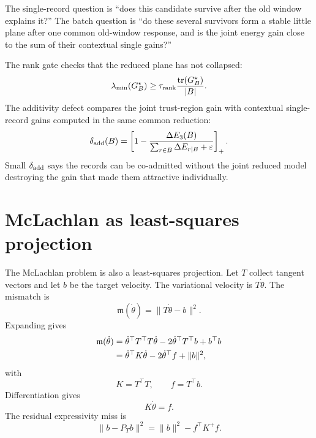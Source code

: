\documentclass[10pt,twocolumn]{article}
\newcommand{\tr}{\operatorname{tr}}
\newcommand{\eps}{\varepsilon}
\begin{document}
\begin{intuitionbox}
The single-record question is ``does this candidate survive after the old
window explains it?'' The batch question is ``do these several survivors form a
stable little plane after one common old-window response, and is the joint
energy gain close to the sum of their contextual single gains?''
\end{intuitionbox}

The rank gate checks that the reduced plane has not collapsed:
\[
\lambda_{\min}(G_B^\star)
\ge
\tau_{\rm rank}\frac{\tr(G_B^\star)}{|B|}.
\]
The additivity defect compares the joint trust-region gain with contextual
single-record gains computed in the same common reduction:
\[
\delta_{\rm add}(B)
=
\left[
1-\frac{\Delta E_3(B)}
{\sum_{r\in B}\Delta E_{r\mid B}+\eps}
\right]_+.
\]
Small \(\delta_{\rm add}\) says the records can be co-admitted without the joint
reduced model destroying the gain that made them attractive individually.

\section{McLachlan as least-squares projection}

The McLachlan problem is also a least-squares projection. Let $T$ collect tangent vectors and let $b$ be the target velocity. The variational velocity is $T\dot\theta$. The mismatch is
\begin{equation}
\mathfrak m(\dot\theta)=\|T\dot\theta-b\|^2.
\label{eq:mclachlan_mismatch_basic}
\end{equation}
Expanding gives
\begin{align}
\mathfrak m(\dot\theta)
&=\dot\theta^\top T^\top T\dot\theta
-2\dot\theta^\top T^\top b+b^\top b\notag\\
&=\dot\theta^\top K\dot\theta-2\dot\theta^\top f+\|b\|^2,
\label{eq:mclachlan_expanded}
\end{align}
with
\begin{equation}
K=T^\top T,
\qquad f=T^\top b.
\label{eq:mclachlan_Kf}
\end{equation}
Differentiation gives
\begin{equation}
\boxed{K\dot\theta=f.}
\label{eq:mclachlan_normal}
\end{equation}
The residual expressivity miss is
\begin{equation}
\|b-P_Tb\|^2=\|b\|^2-f^\top K^+f.
\label{eq:mclachlan_miss}
\end{equation}
\end{document}
